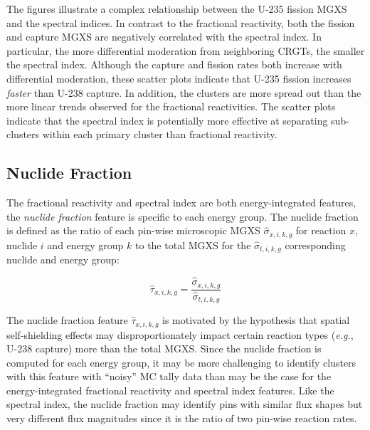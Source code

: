
The figures illustrate a complex relationship between the U-235 fission \ac{MGXS} and the spectral indices. In contrast to the fractional reactivity, both the fission and capture \ac{MGXS} are negatively correlated with the spectral index. In particular, the more differential moderation from neighboring \acp{CRGT}, the smaller the spectral index. Although the capture and fission rates both increase with differential moderation, these scatter plots indicate that U-235 fission increases \textit{faster} than U-238 capture. In addition, the clusters are more spread out than the more linear trends observed for the fractional reactivities. The scatter plots indicate that the spectral index is potentially more effective at separating sub-clusters within each primary cluster than fractional reactivity.



\subsection{Nuclide Fraction}
\label{subsec:chap10-nuclide-frac}

The fractional reactivity and spectral index are both energy-integrated features, the \textit{nuclide fraction} feature is specific to each energy group. The nuclide fraction is defined as the ratio of each pin-wise microscopic \ac{MGXS} $\hat{\sigma}_{x,i,k,g}$ for reaction $x$, nuclide $i$ and energy group $k$ to the total \ac{MGXS} for the $\hat{\sigma}_{t,i,k,g}$ corresponding nuclide and energy group:

\begin{equation}
\label{eqn:chap10-nuclide-frac}
\hat{\tau}_{x,i,k,g} = \frac{\hat{\sigma}_{x,i,k,g}}{\hat{\sigma}_{t,i,k,g}}
\end{equation}

The nuclide fraction feature $\hat{\tau}_{x,i,k,g}$ is motivated by the hypothesis that spatial self-shielding effects may disproportionately impact certain reaction types (\textit{e.g.}, U-238 capture) more than the total \ac{MGXS}. Since the nuclide fraction is computed for each energy group, it may be more challenging to identify clusters with this feature with ``noisy'' \ac{MC} tally data than may be the case for the energy-integrated fractional reactivity and spectral index features. Like the spectral index, the nuclide fraction may identify pins with similar flux shapes but very different flux magnitudes since it is the ratio of two pin-wise reaction rates.

